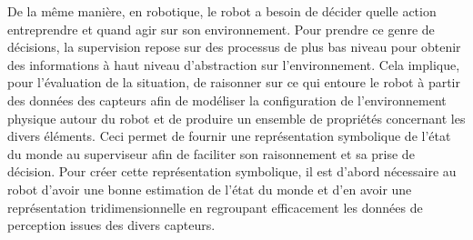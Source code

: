 \documentclass[a4paper,11pt,twoside]{StyleThese}
\begin{document}
De la même manière, en robotique, le robot a besoin de décider quelle action entreprendre et quand agir sur son environnement. Pour prendre ce genre de décisions, la supervision repose sur des processus de plus bas niveau pour obtenir des informations à haut niveau d'abstraction sur l'environnement. Cela implique, pour l'évaluation de la situation, de raisonner sur ce qui entoure le robot à partir des données des capteurs afin de modéliser la configuration de l'environnement physique autour du robot et de produire un ensemble de propriétés concernant les divers éléments. Ceci permet de fournir une représentation symbolique de l'état du monde au superviseur afin de faciliter son raisonnement et sa prise de décision. Pour créer cette représentation symbolique, il est d'abord nécessaire au robot d'avoir une bonne estimation de l'état du monde et d'en avoir une représentation tridimensionnelle en regroupant efficacement les données de perception issues des divers capteurs.



\end{document}
